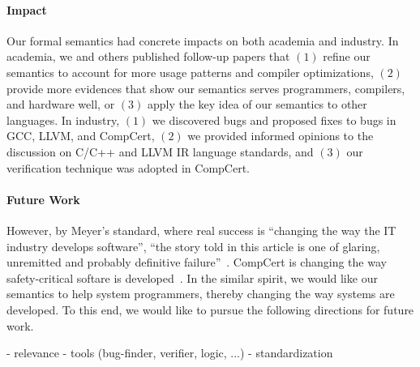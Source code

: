 \paragraph{Impact}

Our formal semantics had concrete impacts on both academia and industry.  In academia, we and others
published follow-up papers that $(1)$ refine our semantics to account for more usage patterns and
compiler optimizations, $(2)$ provide more evidences that show our semantics serves programmers,
compilers, and hardware well, or $(3)$ apply the key idea of our semantics to other languages.  In
industry, $(1)$ we discovered bugs and proposed fixes to bugs in GCC, LLVM, and CompCert, $(2)$ we
provided informed opinions to the discussion on C/C++ and LLVM IR language standards, and $(3)$ our
verification technique was adopted in CompCert.



\paragraph{Future Work}

However, by Meyer's standard, where real success is ``changing the way the IT industry develops
software'', ``the story told in this article is one of glaring, unremitted and probably definitive
failure''~\cite{bertrand-meyer}.  CompCert is changing the way safety-critical softare is
developed~\cite{compcert-avionics,compcert-nuclear}.  In the similar spirit, we would like our
semantics to help system programmers, thereby changing the way systems are developed.  To this end,
we would like to pursue the following directions for future work.


- relevance
- tools (bug-finder, verifier, logic, ...)
- standardization





